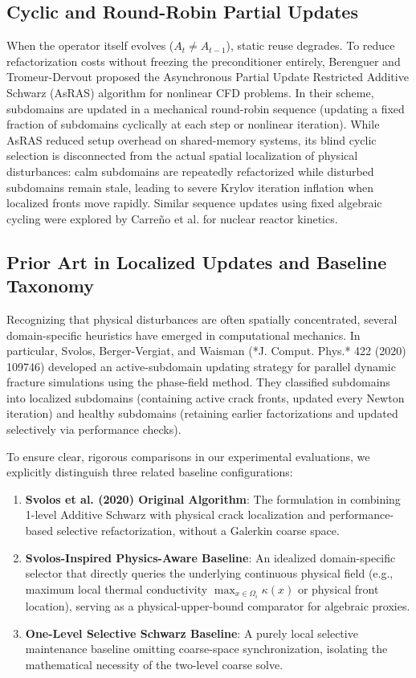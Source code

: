 \documentclass[preprint,12pt,3p]{elsarticle}
\begin{document}
\subsection{Cyclic and Round-Robin Partial Updates}
When the operator itself evolves ($A_t \neq A_{t-1}$), static reuse degrades. To reduce refactorization costs without freezing the preconditioner entirely, Berenguer and Tromeur-Dervout \cite{berenguer2015asynchronous} proposed the Asynchronous Partial Update Restricted Additive Schwarz (AsRAS) algorithm for nonlinear CFD problems. In their scheme, subdomains are updated in a mechanical round-robin sequence (updating a fixed fraction of subdomains cyclically at each step or nonlinear iteration). While AsRAS reduced setup overhead on shared-memory systems, its blind cyclic selection is disconnected from the actual spatial localization of physical disturbances: calm subdomains are repeatedly refactorized while disturbed subdomains remain stale, leading to severe Krylov iteration inflation when localized fronts move rapidly. Similar sequence updates using fixed algebraic cycling were explored by Carre\~{n}o et al. \cite{carreno2022strategies} for nuclear reactor kinetics.

\subsection{Prior Art in Localized Updates and Baseline Taxonomy}
Recognizing that physical disturbances are often spatially concentrated, several domain-specific heuristics have emerged in computational mechanics. In particular, Svolos, Berger-Vergiat, and Waisman \cite{svolos2020updating} (*J. Comput. Phys.* 422 (2020) 109746) developed an active-subdomain updating strategy for parallel dynamic fracture simulations using the phase-field method. They classified subdomains into localized subdomains (containing active crack fronts, updated every Newton iteration) and healthy subdomains (retaining earlier factorizations and updated selectively via performance checks). 

To ensure clear, rigorous comparisons in our experimental evaluations, we explicitly distinguish three related baseline configurations:
\begin{enumerate}
    \item \textbf{Svolos et al. (2020) Original Algorithm}: The formulation in \cite{svolos2020updating} combining 1-level Additive Schwarz with physical crack localization and performance-based selective refactorization, without a Galerkin coarse space.
    \item \textbf{Svolos-Inspired Physics-Aware Baseline}: An idealized domain-specific selector that directly queries the underlying continuous physical field (e.g., maximum local thermal conductivity $\max_{x \in \Omega_i} \kappa(x)$ or physical front location), serving as a physical-upper-bound comparator for algebraic proxies.
    \item \textbf{One-Level Selective Schwarz Baseline}: A purely local selective maintenance baseline omitting coarse-space synchronization, isolating the mathematical necessity of the two-level coarse solve.
\end{enumerate}
\end{document}
